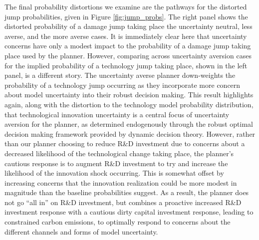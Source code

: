\documentclass[12pt]{article}
\begin{document}

The final probability distortions we examine are the pathways for the distorted jump probabilities, given in Figure \ref{fig:jump_probs}. The right panel shows the distorted probability of a damage jump taking place the uncertainty neutral, less averse, and the more averse cases. It is immediately clear here that uncertainty concerns have only a modest impact to the probability of a damage jump taking place used by the planner. However, comparing across uncertainty aversion cases for the implied probability of a technology jump taking place, shown in the left panel, is a different story. The uncertainty averse planner down-weights the probability of a technology jump occurring as they incorporate more concern about model uncertainty into their robust decision making. This result highlights again, along with the distortion to the technology model probability distribution, that technological innovation uncertainty is a central focus of uncertainty aversion for the planner, as determined endogenously through the robust optimal decision making framework provided by dynamic decision theory. However, rather than our planner choosing to reduce R\&D investment due to concerns about a decreased likelihood of the technological change taking place, the planner's cautious response is to augment R\&D investment to try and increase the likelihood of the innovation shock occurring. This is somewhat offset by increasing concerns that the innovation realization could be more modest in magnitude than the baseline probabilities suggest. As a result, the planner does not go ``all in'' on R\&D investment, but combines a proactive increased R\&D investment response with a cautious dirty capital investment response, leading to constrained carbon emissions, to optimally respond to concerns about the different channels and forms of model uncertainty.
\end{document}
